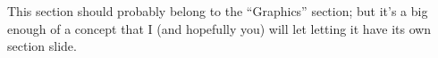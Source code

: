 This section should probably belong to the ``Graphics'' section; but it's a big enough of a concept that I
(and hopefully you) will let letting it have its own section slide.
